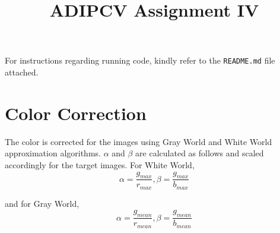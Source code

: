 \documentclass[]{article}
\title{ADIPCV Assignment IV}
\author{}
\begin{document}
\maketitle

For instructions regarding running code, kindly refer to the \texttt{README.md} file attached.

\section{Color Correction}
The color is corrected for the images using Gray World and White World approximation
algorithms. $\alpha$ and  $\beta$ are calculated as follows and scaled accordingly
for the target images. For White World,
\begin{equation}
  \alpha = \frac{g_{max}}{r_{max}}, \beta = \frac{g_{max}}{b_{max}}
\end{equation}

and for Gray World,
\begin{equation}
  \alpha = \frac{g_{mean}}{r_{mean}}, \beta = \frac{g_{mean}}{b_{mean}}
\end{equation}
\end{document}
